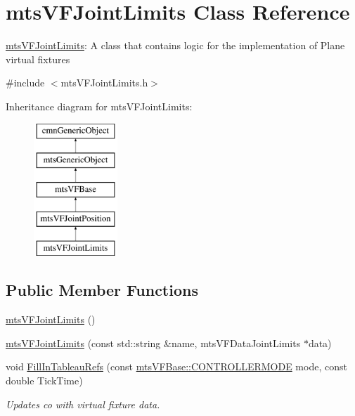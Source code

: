 \hypertarget{classmts_v_f_joint_limits}{\section{mts\-V\-F\-Joint\-Limits Class Reference}
\label{classmts_v_f_joint_limits}
}


\hyperlink{classmts_v_f_joint_limits}{mts\-V\-F\-Joint\-Limits}\-: A class that contains logic for the implementation of Plane virtual fixtures  




{\ttfamily \#include $<$mts\-V\-F\-Joint\-Limits.\-h$>$}

Inheritance diagram for mts\-V\-F\-Joint\-Limits\-:\begin{figure}[H]
\begin{center}
\leavevmode
\includegraphics[height=5.000000cm]{d7/dfc/classmts_v_f_joint_limits}
\end{center}
\end{figure}
\subsection*{Public Member Functions}
\begin{DoxyCompactItemize}
\item 
\hyperlink{classmts_v_f_joint_limits_abe9ac6e3562399c3325f89f7d27c27b9}{mts\-V\-F\-Joint\-Limits} ()
\item 
\hyperlink{classmts_v_f_joint_limits_af9e36f30df5fc584acfa92b96ceb42be}{mts\-V\-F\-Joint\-Limits} (const std\-::string \&name, mts\-V\-F\-Data\-Joint\-Limits $\ast$data)
\item 
void \hyperlink{classmts_v_f_joint_limits_a8015490710d841d44bb9f4b73afe1ca3}{Fill\-In\-Tableau\-Refs} (const \hyperlink{classmts_v_f_base_a742dd08f8b70bafeb746cec14d9ee974}{mts\-V\-F\-Base\-::\-C\-O\-N\-T\-R\-O\-L\-L\-E\-R\-M\-O\-D\-E} mode, const double Tick\-Time)
\begin{DoxyCompactList}\small\item\em Updates co with virtual fixture data. \end{DoxyCompactList}\end{DoxyCompactItemize}
